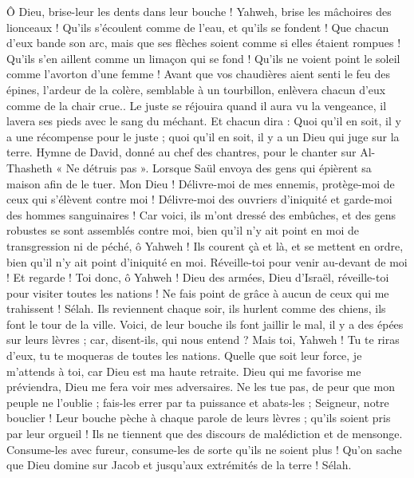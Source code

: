 \begin{multicols}{2}
Ô Dieu, brise-leur les dents dans leur bouche ! Yahweh, brise les mâchoires des lionceaux !
Qu'ils s'écoulent comme de l'eau, et qu'ils se fondent ! Que chacun d'eux bande son arc, mais que ses flèches soient comme si elles étaient rompues !
Qu'ils s'en aillent comme un limaçon qui se fond ! Qu'ils ne voient point le soleil comme l'avorton d'une femme !
Avant que vos chaudières aient senti le feu des épines, l'ardeur de la colère, semblable à un tourbillon, enlèvera chacun d'eux comme de la chair crue..
Le juste se réjouira quand il aura vu la vengeance, il lavera ses pieds avec le sang du méchant.
Et chacun dira : Quoi qu'il en soit, il y a une récompense pour le juste ; quoi qu'il en soit, il y a un Dieu qui juge sur la terre.
\VerseOne{}Hymne de David, donné au chef des chantres, pour le chanter sur Al-Thasheth « Ne détruis pas ». Lorsque Saül envoya des gens qui épièrent sa maison afin de le tuer.
Mon Dieu ! Délivre-moi de mes ennemis, protège-moi de ceux qui s'élèvent contre moi !
Délivre-moi des ouvriers d'iniquité et garde-moi des hommes sanguinaires !
Car voici, ils m'ont dressé des embûches, et des gens robustes se sont assemblés contre moi, bien qu'il n'y ait point en moi de transgression ni de péché, ô Yahweh !
Ils courent çà et là, et se mettent en ordre, bien qu'il n'y ait point d'iniquité en moi. Réveille-toi pour venir au-devant de moi ! Et regarde !
Toi donc, ô Yahweh ! Dieu des armées, Dieu d'Israël, réveille-toi pour visiter toutes les nations ! Ne fais point de grâce à aucun de ceux qui me trahissent ! Sélah.
Ils reviennent chaque soir, ils hurlent comme des chiens, ils font le tour de la ville.
Voici, de leur bouche ils font jaillir le mal, il y a des épées sur leurs lèvres ; car, disent-ils, qui nous entend ?
Mais toi, Yahweh ! Tu te riras d'eux, tu te moqueras de toutes les nations.
Quelle que soit leur force, je m'attends à toi, car Dieu est ma haute retraite.
Dieu qui me favorise me préviendra, Dieu me fera voir mes adversaires.
Ne les tue pas, de peur que mon peuple ne l'oublie ; fais-les errer par ta puissance et abats-les ; Seigneur, notre bouclier !
Leur bouche pèche à chaque parole de leurs lèvres ; qu'ils soient pris par leur orgueil ! Ils ne tiennent que des discours de malédiction et de mensonge.
Consume-les avec fureur, consume-les de sorte qu'ils ne soient plus ! Qu'on sache que Dieu domine sur Jacob et jusqu'aux extrémités de la terre ! Sélah.

\end{multicols}
